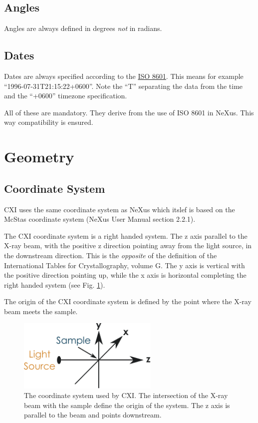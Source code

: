 \documentclass[usletter,11pt]{article}
\begin{document}
\subsection{Angles}
Angles are always defined in degrees {\em not} in radians.

\subsection{Dates} 
Dates are always specified according to the \href{http://www.w3.org/TR/NOTE-datetime}{ISO 8601}.  This means for example ``1996-07-31T21:15:22+0600''.
Note the ``T'' separating the data from the time and the ``+0600'' timezone specification.

All of these are mandatory.
They derive from the use of ISO 8601 in NeXus. This way compatibility is ensured.


\section{Geometry}
\subsection{Coordinate System}
CXI uses the same coordinate system as NeXus which itslef is 
based on the McStas coordinate system (NeXus User Manual section
2.2.1). 

The CXI coordinate system is a right handed system. The z axis
parallel to the X-ray beam, with the positive z direction pointing away
from the light source, in the downstream direction. This is the {\em
  opposite} of the definition of the International Tables for
Crystallography, volume G. The y axis is vertical with the positive
direction pointing up, while the x axis is horizontal completing the
right handed system (see Fig. \ref{fig:cxi_coord_system}).

The origin of the CXI coordinate system is defined by the point where the X-ray
beam meets the sample.

\begin{figure}[h!]
\centering
\includegraphics[width=0.6\textwidth]{coord_system.pdf}
\caption{The coordinate system used by CXI. The intersection of the
 X-ray beam with the sample define the  origin of the system. The z
 axis is parallel to the beam and
 points downstream.}
\label{fig:cxi_coord_system}
\end{figure}
\end{document}
